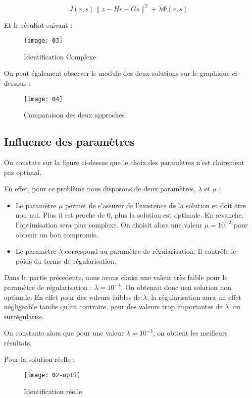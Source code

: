 \documentclass[12pt,a4paper,titlepage]{scrartcl}
\begin{document}
$$ J(r,s) \lVert z - Hr - Gs \rVert^2 + \lambda \Phi(r,s) $$

Et le résultat suivant :

\begin{figure}[H]
    \caption{Identification Complexe}
    \texttt{[image: 03]}
    \centering
\end{figure}

On peut également observer le module des deux solutions sur le graphique
ci-dessous :

\begin{figure}[H]
    \caption{Comparaison des deux approches}
    \texttt{[image: 04]}
    \centering
\end{figure}

\subsection{Influence des paramètres}

On constate sur la figure ci-dessus que le choix des paramètres n'est
clairement pas optimal.

En effet, pour ce problème nous disposons de deux paramètres, $\lambda$
et $\mu$ :

\begin{itemize}
    \item{Le paramètre $\mu$ permet de s'assurer de l'existence de la solution et
        doit être non nul. Plus il est proche de 0, plus la solution
        est optimale. En revanche, l'optimisation sera plus complexe. On
        choisit alors une valeur $\mu = 10^{-2}$ pour obtenir un bon
        compromis.}
    \item{Le paramètre $\lambda$ correspond au paramètre de régularisation.
        Il contrôle le poids du terme de régularisation.}
\end{itemize}

Dans la partie précedente, nous avons choisi une valeur très faible pour
le paramètre de régularisation : $\lambda = 10^{-4}$. On obtenait donc
uen solution non optimale. En effet pour des valeurs faibles de $\lambda$,
la régularisation aura un effet négligeable tandis qu'au contraire,
pour des valeurs trop importantes de $\lambda$, on surrégularise.

On constante alors que pour une valeur $\lambda = 10^{-3}$, on obtient
les meilleurs résultats.

Pour la solution réelle :

\begin{figure}[H]
    \caption{Identification réelle}
    \texttt{[image: 02-opti]}
    \centering
\end{figure}
\end{document}
